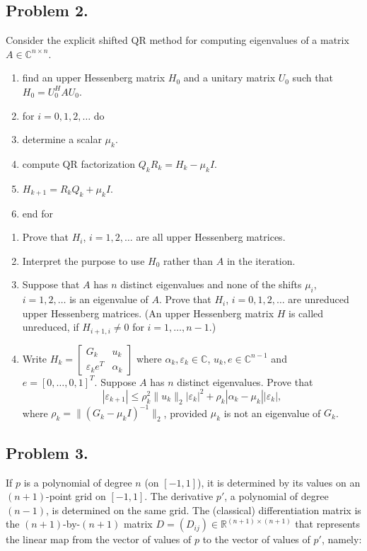 \documentclass[11pt,a4paper]{article}
\begin{document}
\subsection{Problem 2.}
Consider the explicit shifted QR method for computing eigenvalues of a matrix \(A \in \mathbb{C}^{n \times n}\).
\begin{enumerate}[label=\arabic*:,leftmargin=2em]
    \item find an upper Hessenberg matrix \(H_{0}\) and a unitary matrix \(U_{0}\) such that \(H_{0} = U_{0}^{H} A U_{0}\).
    \item for \(i = 0, 1, 2, \dots\) do
    \item determine a scalar \(\mu_{k}\).
    \item compute QR factorization \(Q_{k} R_{k} = H_{k} - \mu_{k} I\).
    \item \(H_{k+1} = R_{k} Q_{k} + \mu_{k} I\).
    \item end for
\end{enumerate}
\begin{enumerate}[label=(\arabic*)]
    \item Prove that \(H_{i}\), \(i = 1, 2, \dots\) are all upper Hessenberg matrices.
    \item Interpret the purpose to use \(H_{0}\) rather than \(A\) in the iteration.
    \item Suppose that \(A\) has \(n\) distinct eigenvalues and none of the shifts \(\mu_{i}\), \(i = 1, 2, \dots\) is an eigenvalue of \(A\). Prove that \(H_{i}\), \(i = 0, 1, 2, \dots\) are unreduced upper Hessenberg matrices. (An upper Hessenberg matrix \(H\) is called unreduced, if \(H_{i+1,i} \neq 0\) for \(i = 1, \dots, n-1\).)
    \item Write \(H_{k} = \begin{bmatrix} G_{k} & u_{k} \\ \varepsilon_{k} e^{T} & \alpha_{k} \end{bmatrix}\) where \(\alpha_{k}, \varepsilon_{k} \in \mathbb{C}\), \(u_{k}, e \in \mathbb{C}^{n-1}\) and \(e = [0, \dots, 0, 1]^{T}\). Suppose \(A\) has \(n\) distinct eigenvalues. Prove that
    \[
    |\varepsilon_{k+1}| \le \rho_{k}^{2} \|u_{k}\|_{2} |\varepsilon_{k}|^{2} + \rho_{k} |\alpha_{k} - \mu_{k}| |\varepsilon_{k}|,
    \]
    where \(\rho_{k} = \|(G_{k} - \mu_{k} I)^{-1}\|_{2}\), provided \(\mu_{k}\) is not an eigenvalue of \(G_{k}\).
\end{enumerate}

\subsection{Problem 3.}
If \(p\) is a polynomial of degree \(n\) (on \([-1, 1]\)), it is determined by its values on an \((n+1)\)-point grid on \([-1, 1]\). The derivative \(p'\), a polynomial of degree \((n-1)\), is determined on the same grid. The (classical) differentiation matrix is the \((n+1)\)-by-\((n+1)\) matrix \(D = (D_{ij}) \in \mathbb{R}^{(n+1) \times (n+1)}\) that represents the linear map from the vector of values of \(p\) to the vector of values of \(p'\), namely:
\end{document}
